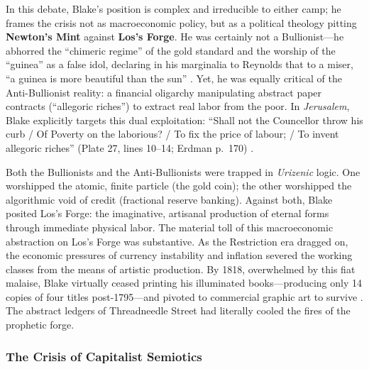 \documentclass[
]{article}
\begin{document}
In this debate, Blake's position is complex and irreducible to either
camp; he frames the crisis not as macroeconomic policy, but as a
political theology pitting \textbf{Newton's Mint} against \textbf{Los's
Forge}. He was certainly not a Bullionist---he abhorred the ``chimeric
regime'' of the gold standard and the worship of the ``guinea'' as a
false idol, declaring in his marginalia to Reynolds that to a miser, ``a
guinea is more beautiful than the sun'' \citep{blake1808annotations}.
Yet, he was equally critical of the Anti-Bullionist reality: a financial
oligarchy manipulating abstract paper contracts (``allegoric riches'')
to extract real labor from the poor. In \emph{Jerusalem}, Blake
explicitly targets this dual exploitation: ``Shall not the Councellor
throw his curb / Of Poverty on the laborious? / To fix the price of
labour; / To invent allegoric riches'' (Plate 27, lines 10--14; Erdman
p.~170) \citep{erdman1988complete, sklar2011blake}.

Both the Bullionists and the Anti-Bullionists were trapped in
\emph{Urizenic} logic. One worshipped the atomic, finite particle (the
gold coin); the other worshipped the algorithmic void of credit
(fractional reserve banking). Against both, Blake posited Los's Forge:
the imaginative, artisanal production of eternal forms through immediate
physical labor. The material toll of this macroeconomic abstraction on
Los's Forge was substantive. As the Restriction era dragged on, the
economic pressures of currency instability and inflation severed the
working classes from the means of artistic production. By 1818,
overwhelmed by this fiat malaise, Blake virtually ceased printing his
illuminated books---producing only 14 copies of four titles
post-1795---and pivoted to commercial graphic art to survive
\citep{makdisi2003william}. The abstract ledgers of Threadneedle Street
had literally cooled the fires of the prophetic forge.

\subsubsection{The Crisis of Capitalist
Semiotics}\label{the-crisis-of-capitalist-semiotics}
\end{document}
